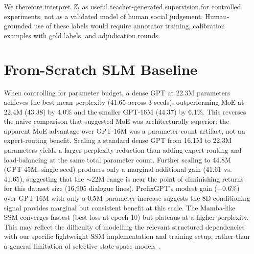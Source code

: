 \documentclass[11pt]{article}
\begin{document}
We therefore interpret $Z_t$ as useful teacher-generated supervision for controlled experiments, not as a validated model of human social judgement.
Human-grounded use of these labels would require annotator training, calibration examples with gold labels, and adjudication rounds.

\section{From-Scratch SLM Baseline}
\label{app:slm_baseline}

\begin{table}[t]
\centering
\caption{From-scratch SLM validation perplexity (20 epochs, 3 seeds). \textbf{Bold}: best mean. GPT-22M is param-matched to MoE at $\sim$22M.}
\label{tab:slm}
\small
{}
\end{table}

When controlling for parameter budget, a dense GPT at 22.3M parameters achieves the best mean perplexity (41.65 across 3 seeds), outperforming MoE at 22.4M (43.38) by 4.0\% and the smaller GPT-16M (44.37) by 6.1\%.
This reverses the naive comparison that suggested MoE was architecturally superior: the apparent MoE advantage over GPT-16M was a parameter-count artifact, not an expert-routing benefit.
Scaling a standard dense GPT from 16.1M to 22.3M parameters yields a larger perplexity reduction than adding expert routing and load-balancing at the same total parameter count.
Further scaling to 44.8M (GPT-45M, single seed) produces only a marginal additional gain (41.61 vs. 41.65), suggesting that the $\sim$22M range is near the point of diminishing returns for this dataset size (16,905 dialogue lines).
PrefixGPT's modest gain ($-0.6\%$) over GPT-16M with only a 0.5M parameter increase suggests the 8D conditioning signal provides marginal but consistent benefit at this scale.
The Mamba-like SSM converges fastest (best loss at epoch 10) but plateaus at a higher perplexity.
This may reflect the difficulty of modelling the relevant structured dependencies with our specific lightweight SSM implementation and training setup, rather than a general limitation of selective state-space models~\cite{gu2023mamba}.
\end{document}
